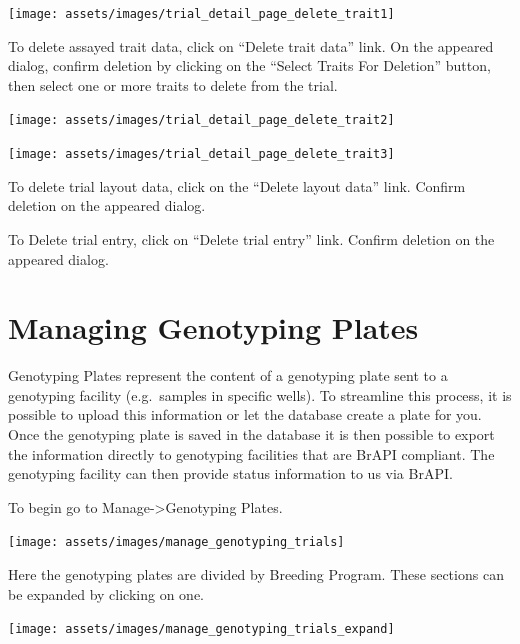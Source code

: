 \documentclass[
  12pt,
]{book}
\begin{document}
\begin{center}\texttt{[image: assets/images/trial\_detail\_page\_delete\_trait1]} \end{center}

To delete assayed trait data, click on ``Delete trait data'' link. On the appeared dialog, confirm deletion by clicking on the ``Select Traits For Deletion'' button, then select one or more traits to delete from the trial.

\begin{center}\texttt{[image: assets/images/trial\_detail\_page\_delete\_trait2]} \end{center}

\begin{center}\texttt{[image: assets/images/trial\_detail\_page\_delete\_trait3]} \end{center}

To delete trial layout data, click on the ``Delete layout data'' link. Confirm deletion on the appeared dialog.

To Delete trial entry, click on ``Delete trial entry'' link. Confirm deletion on the appeared dialog.

\hypertarget{managing-genotyping-plates}{%
\chapter{Managing Genotyping Plates}\label{managing-genotyping-plates}}

Genotyping Plates represent the content of a genotyping plate sent to a genotyping facility (e.g.~samples in specific wells). To streamline this process, it is possible to upload this information or let the database create a plate for you. Once the genotyping plate is saved in the database it is then possible to export the information directly to genotyping facilities that are BrAPI compliant. The genotyping facility can then provide status information to us via BrAPI.

To begin go to Manage-\textgreater Genotyping Plates.

\begin{center}\texttt{[image: assets/images/manage\_genotyping\_trials]} \end{center}

Here the genotyping plates are divided by Breeding Program. These sections can be expanded by clicking on one.

\begin{center}\texttt{[image: assets/images/manage\_genotyping\_trials\_expand]} \end{center}
\end{document}
